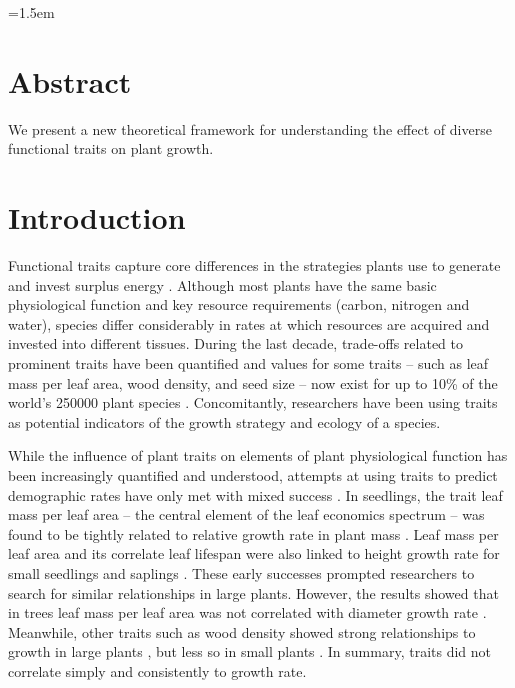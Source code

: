\documentclass[a4paper,11pt]{article}
\date{}
\begin{document}
\mstitlepage
\noindent
\parindent=1.5em
\addtolength{\parskip}{.3em}

\tableofcontents

\section{Abstract}
We present a new theoretical framework for understanding the effect of diverse functional traits on plant growth.

\section{Introduction}

Functional traits capture core differences in the strategies plants use to generate and invest surplus energy \citep{Wright-2004, Chave-2009, Westoby-2002}. Although most plants have the same basic physiological function and key resource requirements (carbon, nitrogen and water), species differ considerably in rates at which resources are acquired and invested into different tissues. During the last decade, trade-offs related to prominent traits have been quantified and values for some traits -- such as leaf mass per leaf area, wood density, and seed size -- now exist for up to 10\% of the world's 250000 plant species \citep{Cornwell-2014}. Concomitantly, researchers have been using traits as potential indicators of the growth strategy and ecology of a species.

While the influence of plant traits on elements of plant physiological function has been increasingly quantified and understood, attempts at using traits to predict demographic rates have only met with mixed success \citep{Wright-2010, Poorter-2008}. In seedlings, the trait leaf mass per leaf area -- the central element of the leaf economics spectrum \citep{Wright-2004} -- was found to be tightly related to relative growth rate in plant mass \citep{Lambers-1992, Wright-2000}. Leaf mass per leaf area and its correlate leaf lifespan were also linked to height growth rate for small seedlings and saplings \citep{Reich-1992, Poorter-2006}. These early successes prompted researchers to search for similar relationships in large plants. However, the results showed that in trees leaf mass per leaf area was not correlated with diameter growth rate \citep{Poorter-2008, Wright-2010, Herault-2011}. Meanwhile, other traits such as wood density showed strong relationships to growth in large plants \citep{Wright-2010}, but less so in small plants \citep{Castro-1998}. In summary, traits did not correlate simply and consistently to growth rate.
\end{document}
